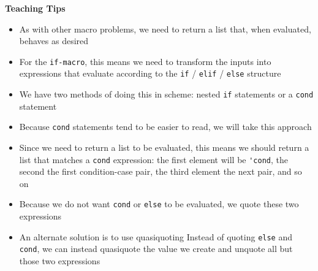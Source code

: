 \begin{guide}
\begin{blocksection}
\textbf{Teaching Tips}
  \begin{itemize}
    \item As with other macro problems, we need to return a list that, when evaluated, behaves as desired
    \item For the \lstinline{if-macro}, this means we need to transform the inputs into expressions that evaluate according to the \lstinline{if} / \lstinline{elif} / \lstinline{else} structure
    \item We have two methods of doing this in scheme: nested \lstinline{if} statements or a \lstinline{cond} statement
    \item Because \lstinline{cond} statements tend to be easier to read, we will take this
    approach
    \item Since we need to return a list to be evaluated, this means we should return a list that matches a \lstinline{cond} expression: the first element will be \lstinline{'cond}, the second the first condition-case pair, the third element the next pair, and so on
   \item Because we do not want \lstinline{cond} or \lstinline{else} to be evaluated, we quote these two expressions
   \item An alternate solution is to use quasiquoting
   Instead of quoting \lstinline{else} and \lstinline{cond}, we can instead quasiquote the value we create and unquote all but those two expressions
  \end{itemize}
\end{blocksection}
\end{guide}

